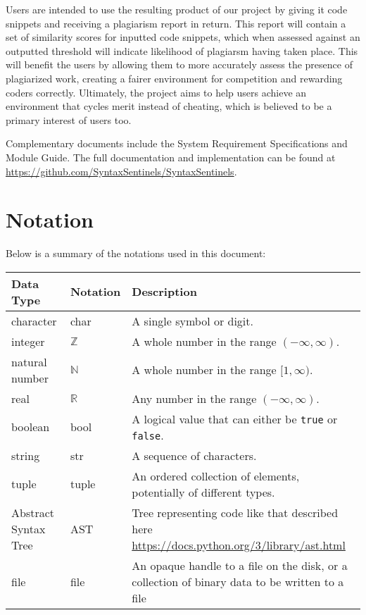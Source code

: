 \documentclass[12pt, titlepage]{article}
\begin{document}
Users are intended to use the resulting product of our project by giving
it code snippets and receiving a plagiarism report in return. This report
will contain a set of similarity scores for inputted code snippets, which when
assessed against an outputted threshold will indicate likelihood of plagiarsm
having taken place. This will benefit the users by allowing them to more accurately assess the presence of plagiarized work, 
creating a fairer environment for competition and rewarding coders correctly. 
Ultimately, the project aims to help users achieve an environment that cycles merit 
instead of cheating, which is believed to be a primary interest of users too.

Complementary documents include the System Requirement Specifications
and Module Guide.  The full documentation and implementation can be
found at \url{https://github.com/SyntaxSentinels/SyntaxSentinels}. 

\section{Notation}

Below is a summary of the notations used in this document:

\begin{center}
\renewcommand{\arraystretch}{1.2}
\noindent
\begin{tabular}{l l p{8cm}} 
\toprule 
\textbf{Data Type} & \textbf{Notation} & \textbf{Description} \\ 
\midrule
character & char & A single symbol or digit. \\ 
integer & $\mathbb{Z}$ & A whole number in the range $(-\infty, \infty)$. \\ 
natural number & $\mathbb{N}$ & A whole number in the range $[1, \infty)$. \\ 
real & $\mathbb{R}$ & Any number in the range $(-\infty, \infty)$. \\ 
boolean & bool & A logical value that can either be \texttt{true} or \texttt{false}. \\
string & str & A sequence of characters. \\ 
tuple & tuple & An ordered collection of elements, potentially of different types. \\
Abstract Syntax Tree & AST & Tree representing code like that described here \url{https://docs.python.org/3/library/ast.html} \\
file & file & An opaque handle to a file on the disk, or a collection of binary data to be written to a file \\
\bottomrule
\end{tabular} 
\end{center}
\end{document}
